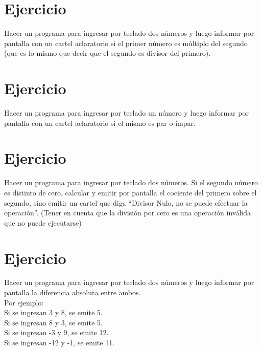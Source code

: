 \documentclass[12pt,a4paper,twoside]{article}
\begin{document}
\newpage

\section{Ejercicio }

\hspace*{1cm}Hacer un programa para ingresar por teclado dos números y luego informar por pantalla
con un cartel aclaratorio si el primer número es múltiplo del segundo (que es lo mismo que
decir que el segundo es divisor del primero).

\newpage

\section{Ejercicio }

\hspace*{1cm}Hacer un programa para ingresar por teclado un número y luego informar por pantalla con
un cartel aclaratorio si el mismo es par o impar.

\newpage

\section{Ejercicio }

\hspace*{1cm}Hacer un programa para ingresar por teclado dos números. Si el segundo número es
distinto de cero, calcular y emitir por pantalla el cociente del primero sobre el segundo, sino
emitir un cartel que diga “Divisor Nulo, no se puede efectuar la operación”. (Tener en cuenta
que la división por cero es una operación inválida que no puede ejecutarse)

\newpage

\section{Ejercicio }

\hspace*{1cm}Hacer un programa para ingresar por teclado dos números y luego informar por pantalla la diferencia absoluta entre ambos.\\
Por ejemplo:\\
Si se ingresan 3 y 8, se emite 5.\\
Si se ingresan 8 y 3, se emite 5.\\
Si se ingresan -3 y 9, se emite 12.\\
Si se ingresan -12 y -1, se emite 11.\\
\end{document}
